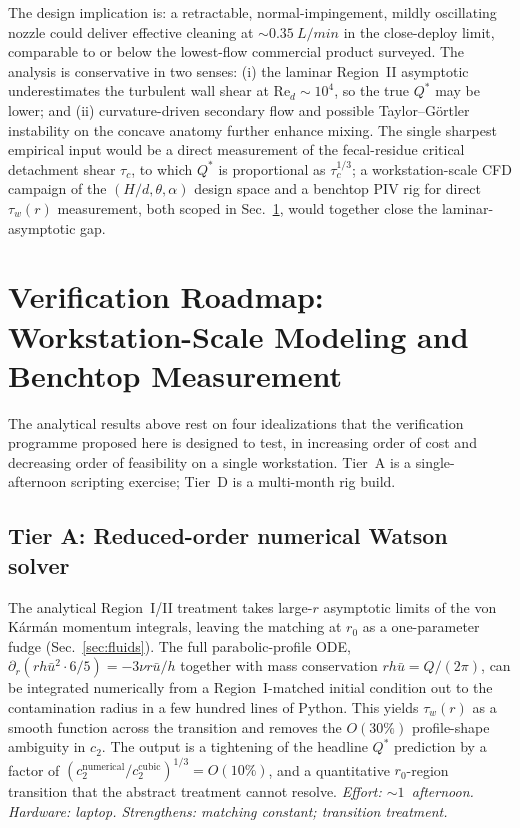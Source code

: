 \documentclass[aps,prfluids,reprint,amsmath,amssymb,floatfix]{revtex4-2}
\newcommand{\Rey}{\mathrm{Re}}
\begin{document}
The design implication is: a retractable, normal-impingement, mildly
oscillating nozzle could deliver effective cleaning at
$\sim\SI{0.35}{L/min}$ in the close-deploy limit, comparable to or below
the lowest-flow commercial product surveyed. The analysis is conservative
in two senses: (i) the laminar Region~II asymptotic underestimates the
turbulent wall shear at $\Rey_d \sim 10^4$, so the true $Q^*$ may be
lower; and (ii) curvature-driven secondary flow and possible
Taylor--G\"ortler instability on the concave anatomy further enhance
mixing. The single sharpest empirical input would be a direct
measurement of the fecal-residue critical detachment shear $\tau_c$, to
which $Q^*$ is proportional as $\tau_c^{1/3}$; a workstation-scale CFD
campaign of the $(H/d,\theta,\alpha)$ design space and a benchtop PIV
rig for direct $\tau_w(r)$ measurement, both scoped in
Sec.~\ref{sec:verification}, would together close the laminar-asymptotic
gap.

\section{Verification Roadmap: Workstation-Scale Modeling and
         Benchtop Measurement}
\label{sec:verification}

The analytical results above rest on four idealizations that the
verification programme proposed here is designed to test, in increasing
order of cost and decreasing order of feasibility on a single
workstation. Tier~A is a single-afternoon scripting exercise; Tier~D is
a multi-month rig build.

\subsection*{Tier A: Reduced-order numerical Watson solver}
The analytical Region~I/II treatment takes large-$r$ asymptotic limits
of the von K\'arm\'an momentum integrals, leaving the matching at
$r_0$ as a one-parameter fudge (Sec.~\ref{sec:fluids}). The full
parabolic-profile ODE,
$\partial_r(r h \bar u^2 \cdot 6/5) = -3\nu r \bar u / h$
together with mass conservation $r h \bar u = Q/(2\pi)$, can be
integrated numerically from a Region~I-matched initial condition
out to the contamination radius in a few hundred lines of Python.
This yields $\tau_w(r)$ as a smooth function across the transition
and removes the $O(30\%)$ profile-shape ambiguity in $c_2$. The
output is a tightening of the headline $Q^*$ prediction by a factor
of $(c_2^\mathrm{numerical}/c_2^\mathrm{cubic})^{1/3} = O(10\%)$,
and a quantitative $r_0$-region transition that the abstract
treatment cannot resolve.
\textit{Effort: $\sim 1$~afternoon. Hardware: laptop.
Strengthens: matching constant; transition treatment.}
\end{document}
